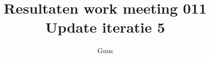 \documentclass[a4paper,final]{article}
\title{Resultaten work meeting 011 Update iteratie 5 }
\author{Guus}
\begin{document}

\newcommand{\Noc}{\textsc{NoC}\xspace}%
\newcommand{\w}[1]{\textsc{#1}\xspace}%
\newcommand{\qml}{\textsc{Qml}\xspace}%
\newcommand{\qt}{\textsc{Qt}\xspace}%
\newcommand{\qtquick}{\textsc{QtQuick}\xspace}%
\newcommand{\cpp}{\textsc{C++}\xspace}%
\newcommand{\code}[1]{\texttt{#1}\xspace}%
\newcommand{\xmas}{\textsc{xmas}\xspace}%
\newcommand{\xmv}{\textsc{Xmv}\xspace}%
\newcommand{\xmd}{\textsc{Xmd}\xspace}%
\newcommand{\xmvtest}{\textsc{XmvTest}\xspace}%
\newcommand{\xmdtest}{\textsc{XmdTest}\xspace}%
\newcommand{\bitpowder}{\textsc{Bitpowder}\xspace}%
\newcommand{\datamodel}{\textsc{datamodel}\xspace}%
\newcommand{\vt}{\textsc{Vt}\xspace}%
\newcommand{\src}{\textsc{src}\xspace}%
\newcommand{\agilefant}{\textsc{AgileFant}\xspace}%
\newcommand{\een}{\'{e}\'{e}n\xspace}%
\newcommand{\svn}{\textsc{svn}\xspace}%
\newcommand{\git}{\textsc{git}\xspace}%
\newcommand{\github}{\textsc{Github}\xspace}%
\newcommand{\subversion}{\textsc{subversion}\xspace}%
\newcommand{\radboud}{\textsc{Radboud}\xspace}%
\newcommand{\uml}{\textsc{uml}\xspace}%
\newcommand{\json}{\textsc{Json}\xspace}%
\end{document}
